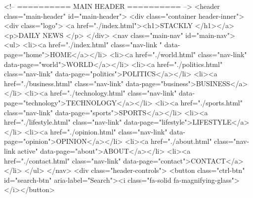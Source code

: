     <!-- ========== MAIN HEADER ========== -->
    <header class="main-header" id="main-header">
        <div class="container header-inner">
            <div class="logo">
                <a href="./index.html"><h1>STACKLY </h1></a>
                <p>DAILY NEWS </p>
            </div>
            <nav class="main-nav" id="main-nav">
                <ul>
                    <li><a href="./index.html" class="nav-link " data-page="home">HOME</a></li>
                    <li><a href="./world.html" class="nav-link" data-page="world">WORLD</a></li>
                    <li><a href="./politics.html" class="nav-link" data-page="politics">POLITICS</a></li>
                    <li><a href="./business.html" class="nav-link" data-page="business">BUSINESS</a></li>
                    <li><a href="./technology.html" class="nav-link" data-page="technology">TECHNOLOGY</a></li>
                    <li><a href="./sports.html" class="nav-link" data-page="sports">SPORTS</a></li>
                    <li><a href="./lifestyle.html" class="nav-link" data-page="lifestyle">LIFESTYLE</a></li>
                    <li><a href="./opinion.html" class="nav-link" data-page="opinion">OPINION</a></li>
                    <li><a href="./about.html" class="nav-link active" data-page="about">ABOUT</a></li>
                <li><a href="./contact.html" class="nav-link" data-page="contact">CONTACT</a></li>
                </ul>
            </nav>
            <div class="header-controls">
                <button class="ctrl-btn" id="search-btn" aria-label="Search"><i
                        class="fa-solid fa-magnifying-glass"></i></button>
                

